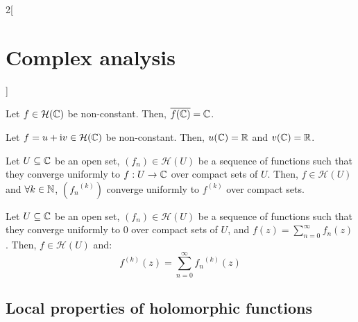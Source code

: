 \documentclass[../../../main_math.tex]{subfiles}
\begin{document}
\begin{multicols}{2}[\section{Complex analysis}]
  \begin{theorem}
    Let $f\in\mathcal{H}(\mathbb{C})$ be non-constant. Then, $\overline{f(\mathbb{C})}=\mathbb{C}$.
  \end{theorem}
  \begin{corollary}
    Let $f=u+\mathrm{i} v\in\mathcal{H}(\mathbb{C})$ be non-constant. Then, $u(\mathbb{C})=\mathbb{R}$ and $v(\mathbb{C})=\mathbb{R}$.
  \end{corollary}
  \begin{theorem}
    Let $U\subseteq\mathbb{C}$ be an open set, $(f_n)\in\mathcal{H}(U)$ be a sequence of functions such that they converge uniformly to $f:U\rightarrow\mathbb{C}$ over compact sets of $U$. Then, $f\in\mathcal{H}(U)$ and $\forall k\in \mathbb{N}$, $({f_n}^{(k)})$ converge uniformly to $f^{(k)}$ over compact sets.
  \end{theorem}
  \begin{corollary}
    Let $U\subseteq\mathbb{C}$ be an open set, $(f_n)\in\mathcal{H}(U)$ be a sequence of functions such that they converge uniformly to 0 over compact sets of $U$, and $f(z)=\sum_{n=0}^\infty f_n(z)$. Then, $f\in\mathcal{H}(U)$ and: $$f^{(k)}(z)=\sum_{n=0}^\infty {f_n}^{(k)}(z)$$
  \end{corollary}
  \subsection{Local properties of holomorphic functions}

\end{multicols}
\end{document}
